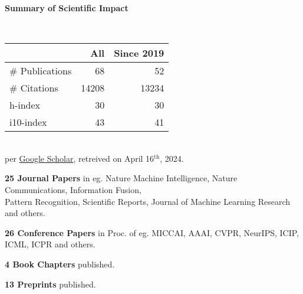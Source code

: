 \headedsection %
{\bf Summary of Scientific Impact}{}{}
{
    \qquad~~~~
    \begin{minipage}[t]{0.6\textwidth}
        \begin{tabular}{lrr}
        \hline
         & All & Since 2019\\
        \hline
        \# Publications & 68     & 52    \\
        \# Citations    & 14208  & 13234 \\
        h-index         & 30     & 30    \\
        i10-index       & 43     & 41    \\
        \hline
    \end{tabular}
    \\
    {\footnotesize{
        per \href{https://scholar.google.com/citations?user=wpLQuroAAAAJ}{Google Scholar},
        retreived on April 16$^\text{th}$, 2024.
        }
    }
    \end{minipage}

    \ifdefined\shortcv
        \vstep
        {\bf 25 Journal Papers} in eg. Nature Machine Intelligence, Nature Communications, Information Fusion,\\
        \hspace*{\fill} Pattern Recognition, Scientific Reports, Journal of Machine Learning Research and others.

        {\bf 26 Conference Papers} in Proc. of eg. MICCAI, AAAI, CVPR, NeurIPS, ICIP, ICML, ICPR and others.

        {\bf 4 Book Chapters} published.

        {\bf 13 Preprints} published.
        
    \else
        {}
    \fi

}
